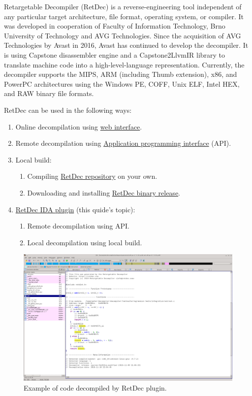 \documentclass[pdftex, a4paper,12pt, oneside, svgnames]{article}
\begin{document}
Retargetable Decompiler (RetDec) is a reverse-engineering tool independent of any particular target architecture, file format, operating system, or compiler. It was developed in cooperation of Faculty of Information Technology, Brno University of Technology and AVG Technologies. Since the acquisition of AVG Technologies by Avast in 2016, Avast has continued to develop the decompiler. It is using Capstone disassembler engine and a Capstone2LlvmIR library to translate machine code into a high-level-language representation. Currently, the decompiler supports the MIPS, ARM (including Thumb extension), x86, and PowerPC architectures using the Windows PE, COFF, Unix ELF, Intel HEX, and RAW binary file formats.

RetDec can be used in the following ways:
\begin{enumerate}
	\item Online decompilation using \href{https://retdec.com/decompilation/}{web interface}.
	\item Remote decompilation using \href{https://retdec.com/api/}{Application programming interface} (API).
	\item Local build:
	\begin{enumerate}
		\item Compiling \href{https://github.com/avast-tl/retdec}{RetDec repository} on your own.
		\item Downloading and installing \href{https://github.com/avast-tl/retdec/releases}{RetDec binary release}.
	\end{enumerate}
	\item \href{https://retdec.com/idaplugin/}{RetDec IDA plugin} (this quide's topic):
	\begin{enumerate}
		\item Remote decompilation using API.
		\item Local decompilation using local build.
	\end{enumerate}
\end{enumerate}

\begin{figure}[!ht]
	\centering
	\includegraphics[width=\textwidth]{figures/overview}
	\caption{Example of code decompiled by RetDec plugin.}
	\label{fig:overview}
\end{figure}
\end{document}

